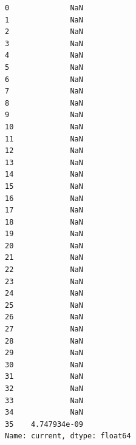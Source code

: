 \documentclass[11pt]{article}
\makeatletter
\newcommand{\boxspacing}{\kern\kvtcb@left@rule\kern\kvtcb@boxsep}
\newcommand{\prompt}[4]{
        \ttfamily\llap{{\color{#2}[#3]:\hspace{3pt}#4}}\vspace{-\baselineskip}
    }
\makeatother
\begin{document}
            \begin{tcolorbox}[breakable, size=fbox, boxrule=.5pt, pad at break*=1mm, opacityfill=0]
\prompt{Out}{outcolor}{88}{\boxspacing}
\begin{Verbatim}[commandchars=\\\{\}]
0              NaN
1              NaN
2              NaN
3              NaN
4              NaN
5              NaN
6              NaN
7              NaN
8              NaN
9              NaN
10             NaN
11             NaN
12             NaN
13             NaN
14             NaN
15             NaN
16             NaN
17             NaN
18             NaN
19             NaN
20             NaN
21             NaN
22             NaN
23             NaN
24             NaN
25             NaN
26             NaN
27             NaN
28             NaN
29             NaN
30             NaN
31             NaN
32             NaN
33             NaN
34             NaN
35    4.747934e-09
Name: current, dtype: float64
\end{Verbatim}
\end{tcolorbox}
        
\end{document}
